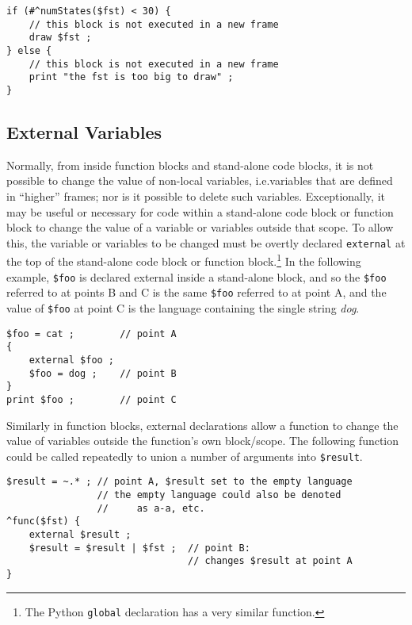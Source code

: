 \begin{Verbatim}
if (#^numStates($fst) < 30) {
    // this block is not executed in a new frame
    draw $fst ;
} else {
    // this block is not executed in a new frame
    print "the fst is too big to draw" ;
}
\end{Verbatim}


\subsection{External Variables}

Normally, from inside function blocks and stand-alone code blocks,
it is not possible to change the value of non-local variables,
i.e.\@ variables that are defined in ``higher'' frames; nor is it
possible to delete such variables.  Exceptionally, it may be useful
or necessary for code within a stand-alone code block or function
block to change the value of a variable or variables outside that
scope.  To allow this, the variable or variables to be changed must
be overtly declared \texttt{external} at the top of the stand-alone
code block or function block.\footnote{The Python \texttt{global}
declaration has a very similar function.}  In the following
example, \verb!$foo! is declared external inside a stand-alone
block, and so the \verb!$foo! referred to at points B and C is the
same \verb!$foo! referred to at point A, and the value of
\verb!$foo! at point C is the language containing the single string
\emph{dog}.

\begin{samepage}
\begin{Verbatim}
$foo = cat ;        // point A
{
    external $foo ; 
    $foo = dog ;    // point B
}
print $foo ;        // point C
\end{Verbatim}
\end{samepage}

\noindent
Similarly in function blocks, external declarations allow a function to change the value
of variables outside the function's own block/scope.  The following function could be
called repeatedly to union a number of arguments into \verb!$result!.

\begin{samepage}
\begin{Verbatim}
$result = ~.* ; // point A, $result set to the empty language
                // the empty language could also be denoted 
                //     as a-a, etc.
^func($fst) {
    external $result ;
    $result = $result | $fst ;  // point B: 
                                // changes $result at point A
}
\end{Verbatim}
\end{samepage}

